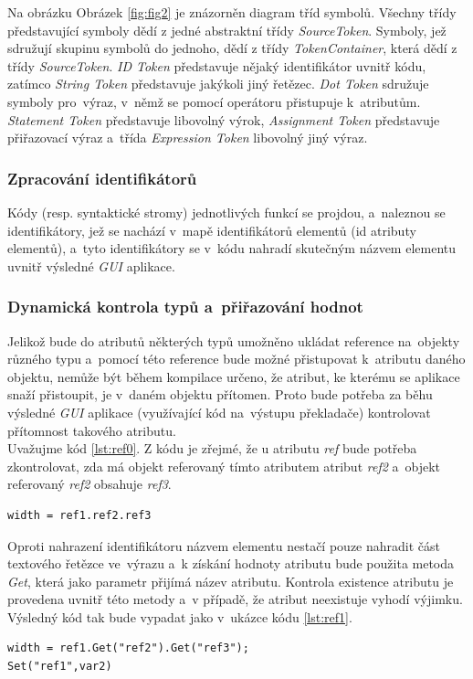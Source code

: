 \documentclass[11pt,twoside,a4paper]{book}
\begin{document}
Na obrázku Obrázek \ref{fig:fig2} je znázorněn diagram tříd symbolů. Všechny třídy představující symboly dědí z jedné abstraktní třídy \textit{SourceToken}. Symboly, jež sdružují skupinu symbolů do jednoho, dědí z třídy \textit{TokenContainer}, která dědí z třídy \textit{SourceToken}. \textit{ID Token} představuje nějaký identifikátor uvnitř kódu, zatímco \textit{String Token} představuje jakýkoli jiný řetězec. \textit{Dot Token} sdružuje symboly pro~výraz, v~němž se pomocí operátoru  přistupuje k~atributům. \textit{Statement Token} představuje libovolný výrok, \textit{Assignment Token} představuje přiřazovací výraz a~třída \textit{Expression Token} libovolný jiný výraz.

\subsubsection{Zpracování identifikátorů}
Kódy (resp. syntaktické stromy) jednotlivých funkcí se projdou, a~naleznou se identifikátory, jež se nachází v~mapě identifikátorů elementů (id atributy elementů), a~tyto identifikátory se v~kódu nahradí skutečným názvem elementu uvnitř výsledné \textit{GUI} aplikace.
\subsubsection{Dynamická kontrola typů a~přiřazování hodnot}
Jelikož bude do atributů některých typů umožněno ukládat reference na~objekty různého typu a~pomocí této reference bude možné přistupovat k~atributu daného objektu, nemůže být během kompilace určeno, že atribut, ke kterému se aplikace snaží přistoupit, je v~daném objektu přítomen. Proto bude potřeba za běhu výsledné \textit{GUI} aplikace (využívající kód na~výstupu překladače) kontrolovat přítomnost takového atributu.\\
Uvažujme kód \ref{lst:ref0}. Z kódu je zřejmé, že u atributu \textit{ref} bude potřeba zkontrolovat, zda má objekt referovaný tímto atributem atribut \textit{ref2} a~objekt referovaný \textit{ref2} obsahuje \textit{ref3}.

\begin{lstlisting}[frame=single,caption=Pseudokód problematického použití operátoru \uv{.} v~přiřazovacím výroku. \label{lst:ref0}]
width = ref1.ref2.ref3
\end{lstlisting}
Oproti nahrazení identifikátoru názvem elementu nestačí pouze nahradit část textového řetězce ve~výrazu a~k získání hodnoty atributu bude použita metoda \textit{Get}, která jako parametr přijímá název atributu. Kontrola existence atributu je provedena uvnitř této metody a~v případě, že atribut neexistuje vyhodí výjimku. Výsledný kód tak bude vypadat jako v~ukázce kódu \ref{lst:ref1}.
\begin{lstlisting}[frame=single,caption=Řešení v~pseudokódu problematického použití operátoru \uv{.} v~přiřazovacím výroku. \label{lst:ref1}]
width = ref1.Get("ref2").Get("ref3");
Set("ref1",var2)
\end{lstlisting}
\end{document}
